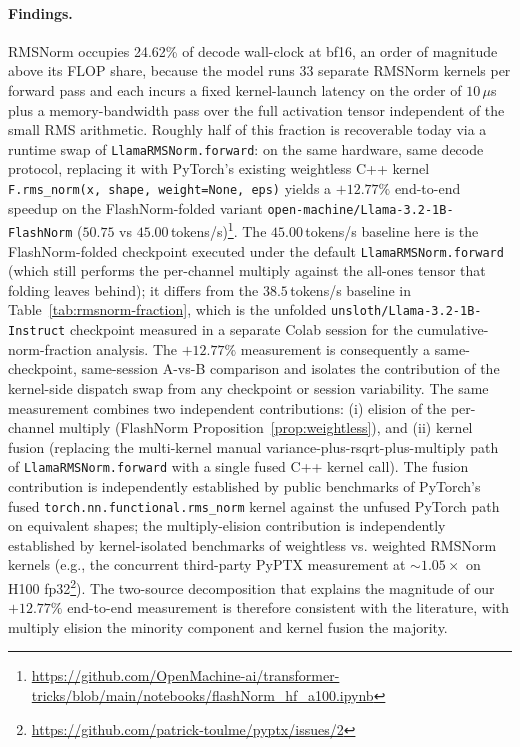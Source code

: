 \documentclass{article}
\begin{document}
\paragraph{Findings.} RMSNorm occupies 24.62\% of decode wall-clock at bf16, an order of magnitude above its FLOP share, because the model runs 33 separate RMSNorm kernels per forward pass and each incurs a fixed kernel-launch latency on the order of $10\,\mu$s plus a memory-bandwidth pass over the full activation tensor independent of the small RMS arithmetic. Roughly half of this fraction is recoverable today via a runtime swap of \texttt{LlamaRMSNorm.forward}: on the same hardware, same decode protocol, replacing it with PyTorch's existing weightless C++ kernel \texttt{F.rms\_norm(x, shape, weight=None, eps)} yields a $\mathbf{+12.77\%}$ end-to-end speedup on the FlashNorm-folded variant
\texttt{open-machine/Llama-3.2-1B-FlashNorm} ($50.75$ vs $45.00$\,tokens/s)\footnote{\url{https://github.com/OpenMachine-ai/transformer-tricks/blob/main/notebooks/flashNorm\_hf\_a100.ipynb}}.
The $45.00$\,tokens/s baseline here is the FlashNorm-folded checkpoint executed under the default \texttt{LlamaRMSNorm.forward} (which still performs the per-channel multiply against the all-ones tensor that folding leaves behind); it differs from the $38.5$\,tokens/s baseline in Table~\ref{tab:rmsnorm-fraction}, which is the unfolded \texttt{unsloth/Llama-3.2-1B-Instruct} checkpoint measured in a separate Colab session for the cumulative-norm-fraction analysis. The $+12.77\%$ measurement is consequently a same-checkpoint, same-session A-vs-B comparison and isolates the contribution of the kernel-side dispatch swap from any checkpoint or session variability. The same measurement combines two independent contributions: (i) elision of the per-channel multiply (FlashNorm Proposition~\ref{prop:weightless}), and (ii) kernel fusion (replacing the multi-kernel manual variance-plus-rsqrt-plus-multiply path of \texttt{LlamaRMSNorm.forward} with a single fused C++ kernel call). The fusion contribution is independently established by public benchmarks of PyTorch's fused \texttt{torch.nn.functional.rms\_norm} kernel against the unfused PyTorch path on equivalent shapes; the multiply-elision contribution is independently established by kernel-isolated benchmarks of weightless vs. weighted RMSNorm kernels (e.g., the concurrent third-party PyPTX measurement at ${\sim}1.05\times$ on H100 fp32\footnote{\url{https://github.com/patrick-toulme/pyptx/issues/2}}). The two-source decomposition that explains the magnitude of our $+12.77\%$ end-to-end measurement is therefore consistent with the literature, with multiply elision the minority component and kernel fusion the majority.
\end{document}
